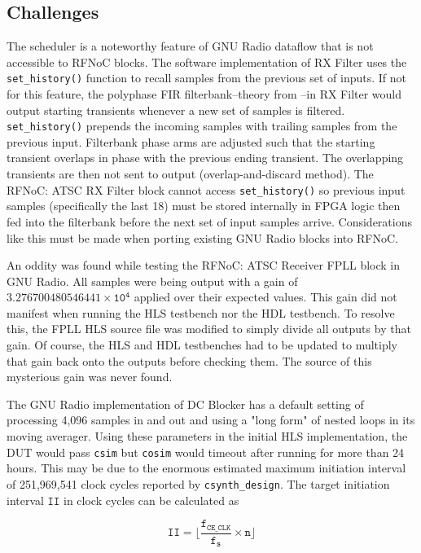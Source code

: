 \documentclass{article}
\begin{document}
\subsection{Challenges} \label{challenges}
The scheduler is a noteworthy feature of GNU Radio dataflow that is not accessible to RFNoC blocks. The software implementation of RX Filter uses the {\tt set\_history()} function to recall samples from the previous set of inputs. If not for this feature, the polyphase FIR filterbank--theory from \cite{harris04}--in RX Filter would output starting transients whenever a new set of samples is filtered. {\tt set\_history()} prepends the incoming samples with trailing samples from the previous input. Filterbank phase arms are adjusted such that the starting transient overlaps in phase with the previous ending transient. The overlapping transients are then not sent to output (overlap-and-discard method). The RFNoC: ATSC RX Filter block cannot access {\tt set\_history()} so previous input samples (specifically the last 18) must be stored internally in FPGA logic then fed into the filterbank before the next set of input samples arrive. Considerations like this must be made when porting existing GNU Radio blocks into RFNoC.

An oddity was found while testing the RFNoC: ATSC Receiver FPLL block in GNU Radio. All samples were being output with a gain of $\mathtt{3.276700480546441\times10^{4}}$ applied over their expected values. This gain did not manifest when running the HLS testbench nor the HDL testbench.  To resolve this, the FPLL HLS source file was modified to simply divide all outputs by that gain. Of course, the HLS and HDL testbenches had to be updated to multiply that gain back onto the outputs before checking them. The source of this mysterious gain was never found.

The GNU Radio implementation of DC Blocker has a default setting of processing 4,096 samples in and out and using a "long form" of nested loops in its moving averager. Using these parameters in the initial HLS implementation, the DUT would pass {\tt csim} but {\tt cosim} would timeout after running for more than 24 hours. This may be due to the enormous estimated maximum initiation interval of 251,969,541 clock cycles reported by {\tt csynth\_design}. The target initiation interval $\mathtt{II}$ in clock cycles can be calculated as

\begin{equation}\label{ii}
\mathtt{II = \lfloor\frac{f_{CE\_CLK}}
{f_{s}}\times{n}\rfloor}
\end{equation}
\end{document}
